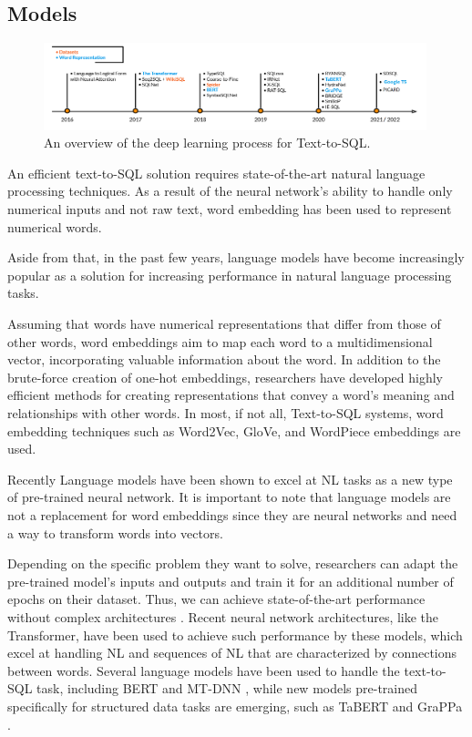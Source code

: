 \subsection{Models}

\begin{figure}[htb]
    \centering
    \includegraphics[width=0.99\textwidth]{pics/Timeline.png}
    \caption{An overview of the deep learning process for Text-to-SQL.}
    \label{fig:timeline}
\end{figure}

An efficient text-to-SQL solution requires state-of-the-art natural language processing techniques.
As a result of the neural network's ability to handle only numerical inputs and not raw text, word embedding has been used to represent numerical words.

Aside from that, in the past few years, language models have become increasingly popular as a solution for increasing performance in natural language processing tasks.

Assuming that words have numerical representations that differ from those of other words, word embeddings aim to map each word to a multidimensional vector, incorporating valuable information about the word. In addition to the brute-force creation of one-hot embeddings, researchers have developed highly efficient methods for creating representations that convey a word's meaning and relationships with other words. In most, if not all, Text-to-SQL systems, word embedding techniques such as Word2Vec\cite{DBLP:journals/corr/Rong14}, GloVe, and WordPiece embeddings\cite{DBLP:journals/corr/WuSCLNMKCGMKSJL16} are used.

Recently Language models have been shown to excel at NL tasks as a new type of pre-trained neural network. It is important to note that language models are not a replacement for word embeddings since they are neural networks and need a way to transform words into vectors.

Depending on the specific problem they want to solve, researchers can adapt the pre-trained model's inputs and outputs and train it for an additional number of epochs on their dataset. Thus, we can achieve state-of-the-art performance without complex architectures \cite{DBLP:journals/corr/abs-1810-04805}. Recent neural network architectures, like the Transformer\cite{DBLP:journals/corr/VaswaniSPUJGKP17}, have been used to achieve such performance by these models, which excel at handling NL and sequences of NL that are characterized by connections between words. Several language models have been used to handle the text-to-SQL task, including BERT \cite{DBLP:journals/corr/abs-1810-04805} and MT-DNN \cite{DBLP:journals/corr/abs-1901-11504}, while new models pre-trained specifically for structured data tasks are emerging, such as TaBERT\cite{DBLP:journals/corr/abs-2005-08314} and GraPPa \cite{DBLP:journals/corr/abs-2009-13845}.

